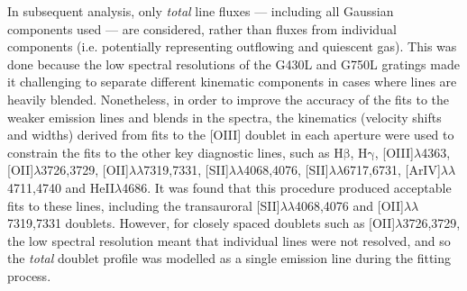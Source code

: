 In subsequent analysis, only \textit{total} line fluxes --- including all Gaussian components used --- are considered, rather than fluxes from individual components (i.e. potentially representing outflowing and quiescent gas). This was done because the low spectral resolutions of the G430L and G750L gratings made it challenging to separate different kinematic components in cases where lines are heavily blended. Nonetheless, in order to improve the accuracy of the fits to the weaker emission lines and blends in the spectra, the kinematics (velocity shifts and widths) derived from fits to the [OIII] doublet in each aperture were used to constrain the fits to the other key diagnostic lines, such as H$\mathrm{\beta}$, H$\mathrm{\gamma}$, [OIII]$\lambda$4363, [OII]$\lambda$3726,3729, [OII]$\lambda\lambda$7319,7331, [SII]$\lambda\lambda$4068,4076, [SII]$\lambda\lambda$6717,6731, [ArIV]$\lambda\lambda$4711,4740 and HeII$\lambda$4686. It was found that this procedure produced acceptable fits to these lines, including the transauroral [SII]$\lambda\lambda$4068,4076 and [OII]$\lambda\lambda$7319,7331 doublets. However, for closely spaced doublets such as [OII]$\lambda$3726,3729, the low spectral resolution meant that individual lines were not resolved, and so the \textit{total} doublet profile was modelled as a single emission line during the fitting process.

